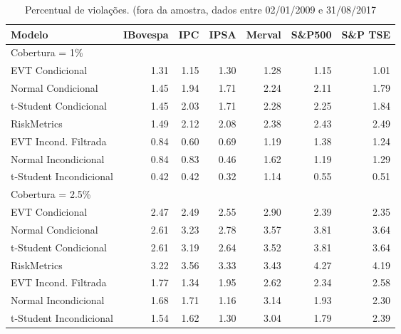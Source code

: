 \begin{table}[H]
\centering
\caption{Percentual de violações. (fora da amostra, dados entre 02/01/2009 e 31/08/2017} 
\label{tab:varviol}
\begin{tabular}{lrrrrrr}
  \hline
Modelo & IBovespa & IPC & IPSA & Merval & S\&P500 & S\&P TSE \\ 
  \hline
Cobertura = 1\% &  &  &  &  &  &  \\ 
  EVT Condicional & 1.31 & 1.15 & 1.30 & 1.28 & 1.15 & 1.01 \\ 
  Normal Condicional & 1.45 & 1.94 & 1.71 & 2.24 & 2.11 & 1.79 \\ 
  t-Student Condicional & 1.45 & 2.03 & 1.71 & 2.28 & 2.25 & 1.84 \\ 
  RiskMetrics & 1.49 & 2.12 & 2.08 & 2.38 & 2.43 & 2.49 \\ 
  EVT Incond. Filtrada & 0.84 & 0.60 & 0.69 & 1.19 & 1.38 & 1.24 \\ 
  Normal Incondicional & 0.84 & 0.83 & 0.46 & 1.62 & 1.19 & 1.29 \\ 
  t-Student Incondicional & 0.42 & 0.42 & 0.32 & 1.14 & 0.55 & 0.51 \\ 
  Cobertura = 2.5\% &  &  &  &  &  &  \\ 
  EVT Condicional & 2.47 & 2.49 & 2.55 & 2.90 & 2.39 & 2.35 \\ 
  Normal Condicional & 2.61 & 3.23 & 2.78 & 3.57 & 3.81 & 3.64 \\ 
  t-Student Condicional & 2.61 & 3.19 & 2.64 & 3.52 & 3.81 & 3.64 \\ 
  RiskMetrics & 3.22 & 3.56 & 3.33 & 3.43 & 4.27 & 4.19 \\ 
  EVT Incond. Filtrada & 1.77 & 1.34 & 1.95 & 2.62 & 2.34 & 2.58 \\ 
  Normal Incondicional & 1.68 & 1.71 & 1.16 & 3.14 & 1.93 & 2.30 \\ 
  t-Student Incondicional & 1.54 & 1.62 & 1.30 & 3.04 & 1.79 & 2.39 \\ 
   \hline
\end{tabular}
\end{table}
